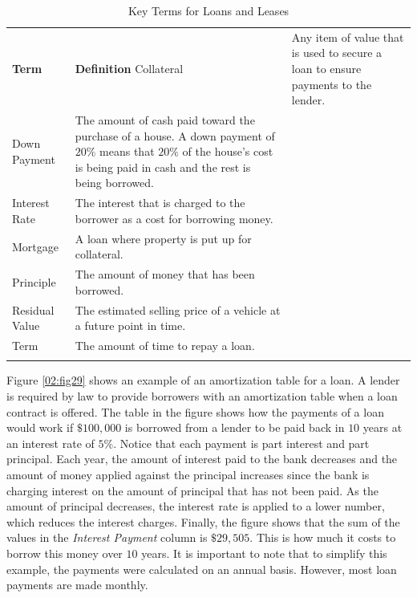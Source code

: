 \begin{table}[H]
	{\small
		\begin{longtable}{L{0.75in}L{3.50in}} %
			\textbf{Term} & \textbf{Definition} \endhead
			\hline
			Collateral & Any item of value that is used to secure a loan to ensure payments to the lender.\\
			Down Payment & The amount of cash paid toward the purchase of a house. A down payment of $ 20\% $ means that $ 20\% $ of the house's cost is being paid in cash and the rest is being borrowed.\\
			Interest Rate & The interest that is charged to the borrower as a cost for borrowing money.\\
			Mortgage & A loan where property is put up for collateral.\\
			Principle & The amount of money that has been borrowed.\\
			Residual Value & The estimated selling price of a vehicle at a future point in time.\\
			Term & The amount of time to repay a loan.\\
			\caption{Key Terms for Loans and Leases}
			\label{02:tab05}
		\end{longtable}
	} %
\end{table}

Figure \ref{02:fig29} shows an example of an amortization table for a loan. A lender is required by law to provide borrowers with an amortization table when a loan contract is offered. The table in the figure shows how the payments of a loan would work if $ \$100,000 $ is borrowed from a lender to be paid back in $ 10 $ years at an interest rate of $ 5\% $. Notice that each payment is part interest and part principal. Each year, the amount of interest paid to the bank decreases and the amount of money applied against the principal increases since the bank is charging interest on the amount of principal that has not been paid. As the amount of principal decreases, the interest rate is applied to a lower number, which reduces the interest charges. Finally, the figure shows that the sum of the values in the \textit{Interest Payment} column is $ \$29,505 $. This is how much it costs to borrow this money over $ 10 $ years. It is important to note that to simplify this example, the payments were calculated on an annual basis. However, most loan payments are made monthly.


